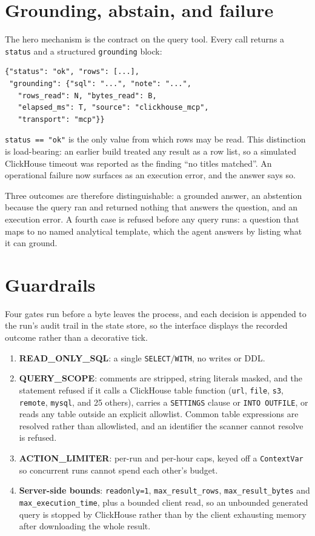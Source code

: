\documentclass[10pt,twocolumn]{article}
\begin{document}
\section{Grounding, abstain, and failure}
The hero mechanism is the contract on the query tool. Every call returns a
\texttt{status} and a structured \texttt{grounding} block:
\begin{lstlisting}
{"status": "ok", "rows": [...],
 "grounding": {"sql": "...", "note": "...",
   "rows_read": N, "bytes_read": B,
   "elapsed_ms": T, "source": "clickhouse_mcp",
   "transport": "mcp"}}
\end{lstlisting}
\texttt{status == "ok"} is the only value from which rows may be read. This
distinction is load-bearing: an earlier build treated any result as a row list,
so a simulated ClickHouse timeout was reported as the finding ``no titles
matched''. An operational failure now surfaces as an execution error, and the
answer says so.

Three outcomes are therefore distinguishable: a grounded answer, an abstention
because the query ran and returned nothing that answers the question, and an
execution error. A fourth case is refused before any query runs: a question that
maps to no named analytical template, which the agent answers by listing what it
can ground.

\section{Guardrails}
Four gates run before a byte leaves the process, and each decision is appended to
the run's audit trail in the state store, so the interface displays the recorded
outcome rather than a decorative tick.

\begin{enumerate}
\item \textbf{READ\_ONLY\_SQL}: a single \texttt{SELECT}/\texttt{WITH}, no writes
or DDL.
\item \textbf{QUERY\_SCOPE}: comments are stripped, string literals masked, and
the statement refused if it calls a ClickHouse table function (\texttt{url},
\texttt{file}, \texttt{s3}, \texttt{remote}, \texttt{mysql}, and 25 others),
carries a \texttt{SETTINGS} clause or \texttt{INTO OUTFILE}, or reads any table
outside an explicit allowlist. Common table expressions are resolved rather than
allowlisted, and an identifier the scanner cannot resolve is refused.
\item \textbf{ACTION\_LIMITER}: per-run and per-hour caps, keyed off a
\texttt{ContextVar} so concurrent runs cannot spend each other's budget.
\item \textbf{Server-side bounds}: \texttt{readonly=1},
\texttt{max\_result\_rows}, \texttt{max\_result\_bytes} and
\texttt{max\_execution\_time}, plus a bounded client read, so an unbounded
generated query is stopped by ClickHouse rather than by the client exhausting
memory after downloading the whole result.
\end{enumerate}
\end{document}
